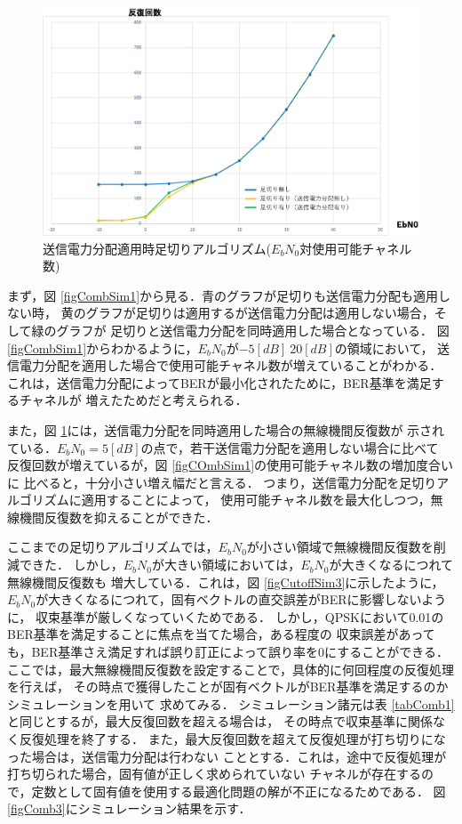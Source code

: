 \begin{figure}[ht]
    \centering
    \includegraphics[width=0.95\linewidth]{chapter4/figure/CombSim2.eps}
    \caption{送信電力分配適用時足切りアルゴリズム($E_bN_0$対使用可能チャネル数)}
    \label{figCombSim2}
\end{figure}

まず，図 \ref{figCombSim1}から見る．青のグラフが足切りも送信電力分配も適用しない時，
黄のグラフが足切りは適用するが送信電力分配は適用しない場合，そして緑のグラフが
足切りと送信電力分配を同時適用した場合となっている．
図 \ref{figCombSim1}からわかるように，$E_bN_0$が$-5[dB]~20[dB]$の領域において，
送信電力分配を適用した場合で使用可能チャネル数が増えていることがわかる．
これは，送信電力分配によってBERが最小化されたために，BER基準を満足するチャネルが
増えたためだと考えられる．

また，図 \ref{figCombSim2}には，送信電力分配を同時適用した場合の無線機間反復数が
示されている．$E_bN_0=5[dB]$の点で，若干送信電力分配を適用しない場合に比べて
反復回数が増えているが，図 \ref{figCOmbSim1}の使用可能チャネル数の増加度合いに
比べると，十分小さい増え幅だと言える．
つまり，送信電力分配を足切りアルゴリズムに適用することによって，
使用可能チャネル数を最大化しつつ，無線機間反復数を抑えることができた．

ここまでの足切りアルゴリズムでは，$E_bN_0$が小さい領域で無線機間反復数を削減できた．
しかし，$E_bN_0$が大きい領域においては，$E_bN_0$が大きくなるにつれて無線機間反復数も
増大している．これは，図 \ref{figCutoffSim3}に示したように，
$E_bN_0$が大きくなるにつれて，固有ベクトルの直交誤差がBERに影響しないように，
収束基準が厳しくなっていくためである．
しかし，QPSKにおいて0.01のBER基準を満足することに焦点を当てた場合，ある程度の
収束誤差があっても，BER基準さえ満足すれば誤り訂正によって誤り率を0にすることができる．
ここでは，最大無線機間反復数を設定することで，具体的に何回程度の反復処理を行えば，
その時点で獲得したことが固有ベクトルがBER基準を満足するのかシミュレーションを用いて
求めてみる．
シミュレーション諸元は表 \ref{tabComb1}と同じとするが，最大反復回数を超える場合は，
その時点で収束基準に関係なく反復処理を終了する．
また，最大反復回数を超えて反復処理が打ち切りになった場合は，送信電力分配は行わない
こととする．これは，途中で反復処理が打ち切られた場合，固有値が正しく求められていない
チャネルが存在するので，定数として固有値を使用する最適化問題の解が不正になるためである．
図 \ref{figComb3}にシミュレーション結果を示す．

